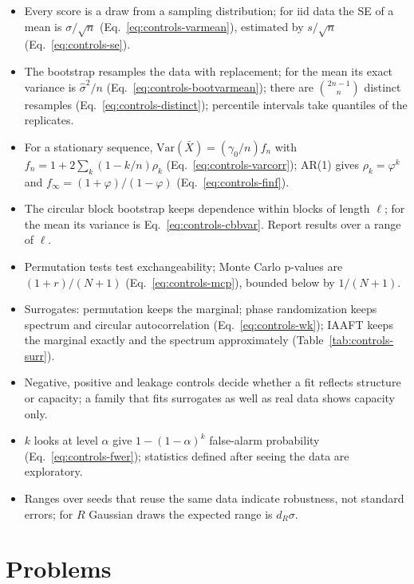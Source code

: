 \begin{itemize}
\item Every score is a draw from a sampling distribution; for iid data the SE of a mean is $\sigma/\sqrt n$ (Eq.~\eqref{eq:controls-varmean}), estimated by $s/\sqrt n$ (Eq.~\eqref{eq:controls-se}).
\item The bootstrap resamples the data with replacement; for the mean its exact variance is $\hat\sigma^2/n$ (Eq.~\eqref{eq:controls-bootvarmean}); there are $\binom{2n-1}{n}$ distinct resamples (Eq.~\eqref{eq:controls-distinct}); percentile intervals take quantiles of the replicates.
\item For a stationary sequence, $\mathrm{Var}(\bar X)=(\gamma_0/n)f_n$ with $f_n=1+2\sum_k(1-k/n)\rho_k$ (Eq.~\eqref{eq:controls-varcorr}); AR(1) gives $\rho_k=\varphi^k$ and $f_\infty=(1+\varphi)/(1-\varphi)$ (Eq.~\eqref{eq:controls-finf}).
\item The circular block bootstrap keeps dependence within blocks of length $\ell$; for the mean its variance is Eq.~\eqref{eq:controls-cbbvar}. Report results over a range of $\ell$.
\item Permutation tests test exchangeability; Monte Carlo p-values are $(1+r)/(N+1)$ (Eq.~\eqref{eq:controls-mcp}), bounded below by $1/(N+1)$.
\item Surrogates: permutation keeps the marginal; phase randomization keeps spectrum and circular autocorrelation (Eq.~\eqref{eq:controls-wk}); IAAFT keeps the marginal exactly and the spectrum approximately (Table~\ref{tab:controls-surr}).
\item Negative, positive and leakage controls decide whether a fit reflects structure or capacity; a family that fits surrogates as well as real data shows capacity only.
\item $k$ looks at level $\alpha$ give $1-(1-\alpha)^k$ false-alarm probability (Eq.~\eqref{eq:controls-fwer}); statistics defined after seeing the data are exploratory.
\item Ranges over seeds that reuse the same data indicate robustness, not standard errors; for $R$ Gaussian draws the expected range is $d_R\sigma$.
\end{itemize}

\section{Problems}

